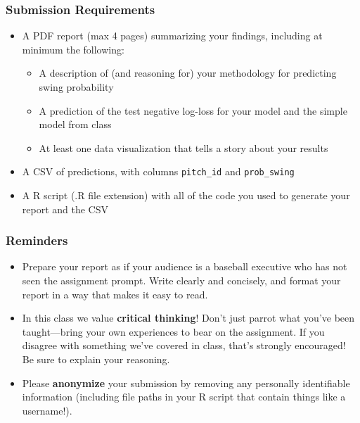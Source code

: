 \documentclass{article}
\begin{document}
      \subsubsection*{\sc Submission Requirements}

        \begin{itemize}
          \item A PDF report (max 4 pages) summarizing your findings, including at minimum the following:
          \begin{itemize}
            \item A description of (and reasoning for) your methodology for predicting swing probability
            \item A prediction of the test negative log-loss for your model and the simple model from class
            \item At least one data visualization that tells a story about your results
          \end{itemize}
          \item A CSV of predictions, with columns \texttt{pitch\_id} and \texttt{prob\_swing}
          \item A R script (.R file extension) with all of the code you used to generate your report and the CSV
        \end{itemize}

      \subsubsection*{\sc Reminders}

        \begin{itemize}
          \item Prepare your report as if your audience is a baseball executive who has not seen the assignment prompt. Write clearly and concisely, and format your report in a way that makes it easy to read.
          \item In this class we value {\bf critical thinking}! Don't just parrot what you've been taught---bring your own experiences to bear on the assignment. If you disagree with something we've covered in class, that's strongly encouraged! Be sure to explain your reasoning.
          \item Please {\bf anonymize} your submission by removing any personally identifiable information (including file paths in your R script that contain things like a username!).
        \end{itemize}
\end{document}
